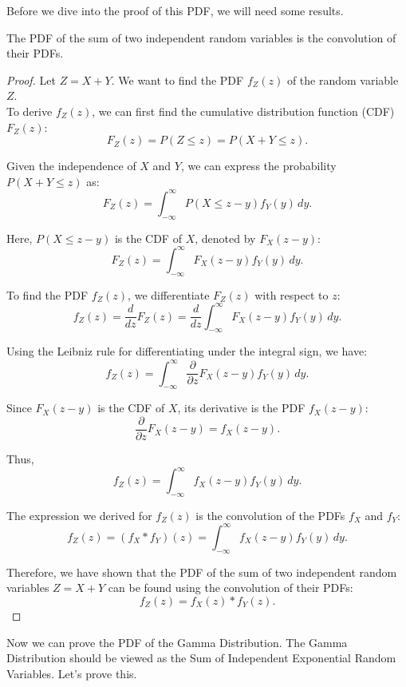 Before we dive into the proof of this PDF, we will need some results. 

\begin{theorem}
    The PDF of the sum of two independent random variables is the convolution of their PDFs. 
\end{theorem}

\begin{proof}
    Let \(Z = X + Y\). We want to find the PDF \(f_Z(z)\) of the random variable \(Z\).\\

    To derive \(f_Z(z)\), we can first find the cumulative distribution function (CDF) \(F_Z(z)\):
\[
F_Z(z) = P(Z \leq z) = P(X + Y \leq z).
\]

Given the independence of \(X\) and \(Y\), we can express the probability \(P(X + Y \leq z)\) as:
\[
F_Z(z) = \int_{-\infty}^{\infty} P(X \leq z - y) f_Y(y) \, dy.
\]

Here, \(P(X \leq z - y)\) is the CDF of \(X\), denoted by \(F_X(z - y)\):
\[
F_Z(z) = \int_{-\infty}^{\infty} F_X(z - y) f_Y(y) \, dy.
\]

To find the PDF \(f_Z(z)\), we differentiate \(F_Z(z)\) with respect to \(z\):
\[
f_Z(z) = \frac{d}{dz} F_Z(z) = \frac{d}{dz} \int_{-\infty}^{\infty} F_X(z - y) f_Y(y) \, dy.
\]

Using the Leibniz rule for differentiating under the integral sign, we have:
\[
f_Z(z) = \int_{-\infty}^{\infty} \frac{\partial}{\partial z} F_X(z - y) f_Y(y) \, dy.
\]

Since \(F_X(z - y)\) is the CDF of \(X\), its derivative is the PDF \(f_X(z - y)\):
\[
\frac{\partial}{\partial z} F_X(z - y) = f_X(z - y).
\]

Thus,
\[
f_Z(z) = \int_{-\infty}^{\infty} f_X(z - y) f_Y(y) \, dy.
\]

The expression we derived for \(f_Z(z)\) is the convolution of the PDFs \(f_X\) and \(f_Y\):
\[
f_Z(z) = (f_X * f_Y)(z) = \int_{-\infty}^{\infty} f_X(z - y) f_Y(y) \, dy.
\]

Therefore, we have shown that the PDF of the sum of two independent random variables \(Z = X + Y\) can be found using the convolution of their PDFs:
\[
f_Z(z) = f_X(z) * f_Y(z).
\]
\end{proof}

Now we can prove the PDF of the Gamma Distribution. The Gamma Distribution should be viewed as the Sum of Independent Exponential Random Variables. Let's prove this. 

